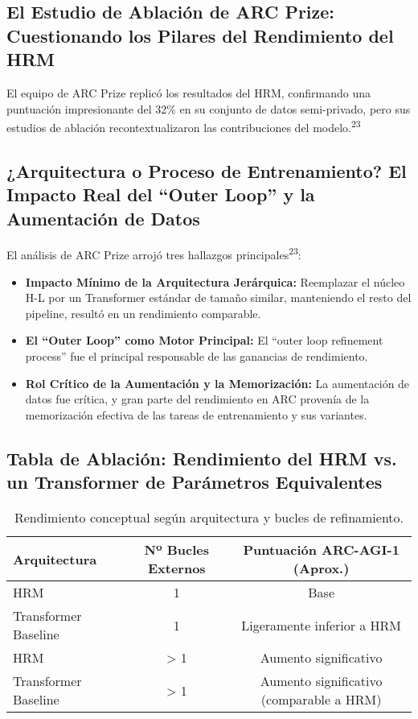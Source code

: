 \documentclass{article}
\begin{document}
	\subsection{El Estudio de Ablación de ARC Prize: Cuestionando los Pilares del Rendimiento del HRM}
	El equipo de ARC Prize replicó los resultados del HRM, confirmando una puntuación impresionante del 32\% en su conjunto de datos semi-privado, pero sus estudios de ablación recontextualizaron las contribuciones del modelo.\textsuperscript{23}
	
	\subsection{¿Arquitectura o Proceso de Entrenamiento? El Impacto Real del ``Outer Loop'' y la Aumentación de Datos}
	El análisis de ARC Prize arrojó tres hallazgos principales\textsuperscript{23}:
	\begin{itemize}
		\item \textbf{Impacto Mínimo de la Arquitectura Jerárquica:} Reemplazar el núcleo H-L por un Transformer estándar de tamaño similar, manteniendo el resto del pipeline, resultó en un rendimiento comparable.
		\item \textbf{El ``Outer Loop'' como Motor Principal:} El ``outer loop refinement process'' fue el principal responsable de las ganancias de rendimiento.
		\item \textbf{Rol Crítico de la Aumentación y la Memorización:} La aumentación de datos fue crítica, y gran parte del rendimiento en ARC provenía de la memorización efectiva de las tareas de entrenamiento y sus variantes.
	\end{itemize}
	
	\subsection{Tabla de Ablación: Rendimiento del HRM vs. un Transformer de Parámetros Equivalentes}
	\begin{table}[h!]
		\centering
		\caption{Rendimiento conceptual según arquitectura y bucles de refinamiento.}
		\label{tab:ablacion}
		\begin{tabular}{@{}lcc@{}}
			\toprule
			\textbf{Arquitectura} & \textbf{Nº Bucles Externos} & \textbf{Puntuación ARC-AGI-1 (Aprox.)} \\
			\midrule
			HRM & 1 & Base \\
			Transformer Baseline & 1 & Ligeramente inferior a HRM \\
			HRM & > 1 & Aumento significativo \\
			Transformer Baseline & > 1 & Aumento significativo (comparable a HRM) \\
			\bottomrule
		\end{tabular}
	\end{table}
	
\end{document}

